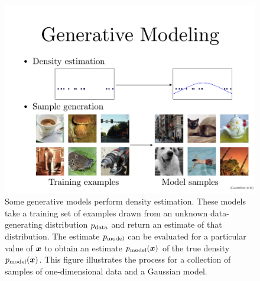 \begin{figure}
\center
\includegraphics[width=\textwidth]{density.pdf}
\caption{Some generative models perform density estimation.
These models take a training set of examples drawn from an unknown
data-generating distribution $p_{\rm{data}}$ and return an estimate of that
distribution. The estimate $p_{\rm{model}}$ can be evaluated for a particular
value of ${\bm{x}}$ to obtain an estimate $p_{\rm{model}}({\bm{x}})$ of the true
density $p_{\rm{model}}({\bm{x}})$.
This figure illustrates the process for a collection of samples of
one-dimensional data and a Gaussian model.
}
\label{fig:density}
\end{figure}

